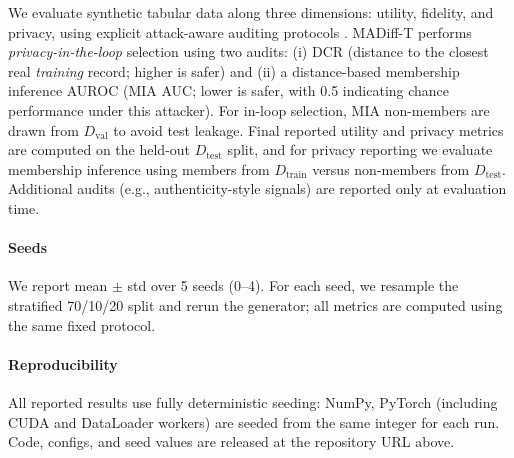 \documentclass[preprint,12pt]{elsarticle}
\begin{document}
We evaluate synthetic tabular data along three dimensions: utility, fidelity, and privacy, using explicit attack-aware auditing protocols \cite{Hernandez2025,Hyrup2025}. MADiff-T performs \emph{privacy-in-the-loop} selection using two audits: (i) DCR (distance to the closest real \emph{training} record; higher is safer) and (ii) a distance-based membership inference AUROC (MIA AUC; lower is safer, with 0.5 indicating chance performance under this attacker). For in-loop selection, MIA non-members are drawn from $D_{\text{val}}$ to avoid test leakage. Final reported utility and privacy metrics are computed on the held-out $D_{\text{test}}$ split, and for privacy reporting we evaluate membership inference using members from $D_{\text{train}}$ versus non-members from $D_{\text{test}}$. Additional audits (e.g., authenticity-style signals) are reported only at evaluation time.
\paragraph{Seeds} We report mean $\pm$ std over 5 seeds (0--4). For each seed, we resample the stratified 70/10/20 split and rerun the generator; all metrics are computed using the same fixed protocol.
\paragraph{Reproducibility} All reported results use fully 
deterministic seeding: NumPy, PyTorch (including CUDA and DataLoader 
workers) are seeded from the same integer for each run. Code, 
configs, and seed values are released at the repository URL above.
\end{document}

